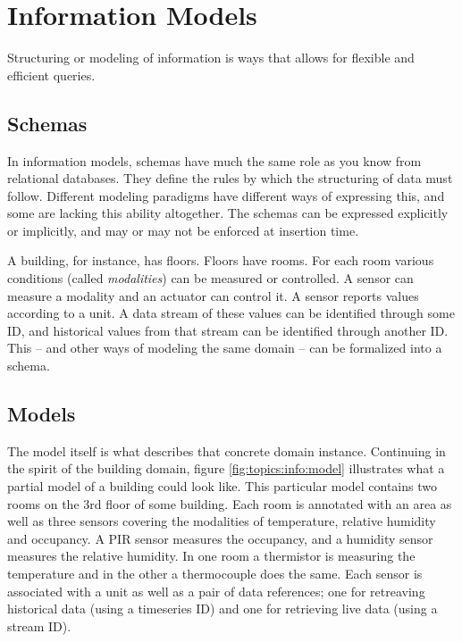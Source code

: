 

\section{Information Models}

Structuring or modeling of information is ways that allows for flexible and efficient queries.

\subsection{Schemas}

In information models, schemas have much the same role as you know from relational databases. They define the rules by which the structuring of data must follow. Different modeling paradigms have different ways of expressing this, and some are lacking this ability altogether. The schemas can be expressed explicitly or implicitly, and may or may not be enforced at insertion time.

A building, for instance, has floors. Floors have rooms. For each room various conditions (called \textsl{modalities}) can be measured or controlled. A sensor can measure a modality and an actuator can control it. A sensor reports values according to a unit. A data stream of these values can be identified through some ID, and historical values from that stream can be identified through another ID. This -- and other ways of modeling the same domain -- can be formalized into a schema.

\subsection{Models}

The model itself is what describes that concrete domain instance. Continuing in the spirit of the building domain, figure \ref{fig:topics:info:model} illustrates what a partial model of a building could look like. This particular model contains two rooms on the 3rd floor of some building. Each room is annotated with an area as well as three sensors covering the modalities of temperature, relative humidity and occupancy. A PIR sensor measures the occupancy, and a humidity sensor measures the relative humidity. In one room a thermistor is measuring the temperature and in the other a thermocouple does the same. Each sensor is associated with a unit as well as a pair of data references; one for retreaving historical data (using a timeseries ID) and one for retrieving live data (using a stream ID).

